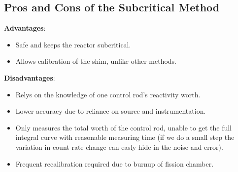 \subsection{Pros and Cons of the Subcritical Method}
    \textbf{Advantages}:
    \begin{itemize}
        \item Safe and keeps the reactor subcritical.
        \item Allows calibration of the shim, unlike other methods.
    \end{itemize}
    \textbf{Disadvantages}:
    \begin{itemize}
        \item Relys on the knowledge of one control rod's reactivity worth.
        \item Lower accuracy due to reliance on source and instrumentation.
        \item Only measures the total worth of the control rod, unable to get the full integral curve with reasonable measuring time (if we do a small step the variation in count rate change can easly hide in the noise and error).
        \item Frequent recalibration required due to burnup of fission chamber.
    \end{itemize}